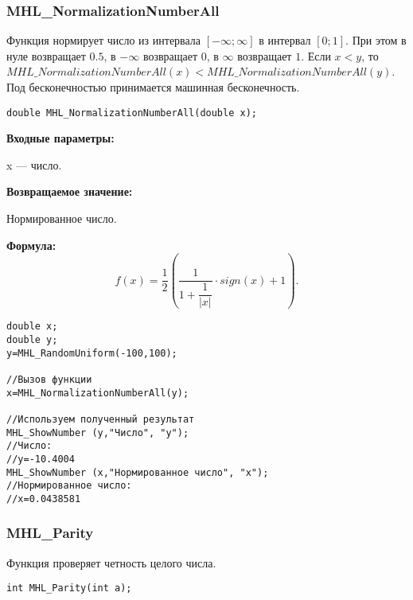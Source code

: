 \documentclass[a4paper,12pt]{article}
\begin{document}
\subsubsection{MHL\_NormalizationNumberAll}\label{MHL_NormalizationNumberAll}

Функция нормирует число из интервала $\left[-\infty;\infty \right] $ в интервал $\left[0;1\right]$. При этом в нуле возвращает $0.5$, в $-\infty$ возвращает $0$, в $\infty$ возвращает $1$. Если $x<y$, то $MHL\_NormalizationNumberAll(x)<MHL\_NormalizationNumberAll(y)$. Под бесконечностью принимается машинная бесконечность.


\begin{lstlisting}[label=code_syntax_MHL_NormalizationNumberAll,caption=Синтаксис]
double MHL_NormalizationNumberAll(double x);
\end{lstlisting}

\textbf{Входные параметры:}

 x --- число.

\textbf{Возвращаемое значение:}
 
Нормированное число.
 
\textbf{Формула:}
\begin{equation*}
f\left(x \right)=\frac{1}{2}\left( \dfrac{1}{1+\dfrac{1}{\left| x\right| }}\cdot sign \left( x\right)+1 \right) .
\end{equation*}


\begin{lstlisting}[label=code_use_MHL_NormalizationNumberAll,caption=Пример использования]
double x;
double y;
y=MHL_RandomUniform(-100,100);

//Вызов функции
x=MHL_NormalizationNumberAll(y);

//Используем полученный результат
MHL_ShowNumber (y,"Число", "y");
//Число:
//y=-10.4004
MHL_ShowNumber (x,"Нормированное число", "x");
//Нормированное число:
//x=0.0438581
\end{lstlisting}

\subsubsection{MHL\_Parity}\label{MHL_Parity}

Функция проверяет четность целого числа.


\begin{lstlisting}[label=code_syntax_MHL_Parity,caption=Синтаксис]
int MHL_Parity(int a);
\end{lstlisting}
\end{document}
